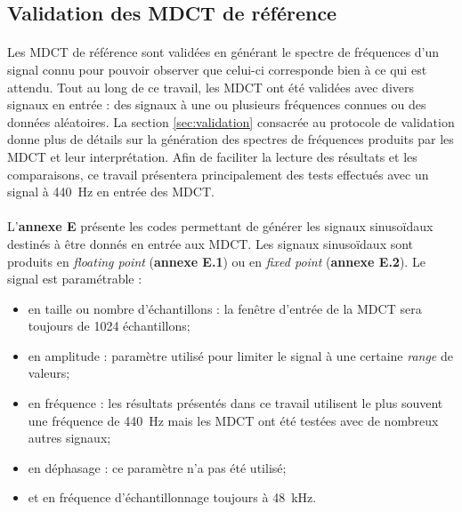 \documentclass{article}
\begin{document}
    \subsection{Validation des MDCT de référence}

    \paragraph{}
    Les MDCT de référence sont validées en générant le spectre de fréquences d'un signal connu pour pouvoir observer que celui-ci corresponde bien à ce qui est attendu. Tout au long de ce travail, les MDCT ont été validées avec divers signaux en entrée : des signaux à une ou plusieurs fréquences connues ou des données aléatoires. La section \ref{sec:validation} consacrée au protocole de validation donne plus de détails sur la génération des spectres de fréquences produits par les MDCT et leur interprétation. Afin de faciliter la lecture des résultats et les comparaisons, ce travail présentera principalement des tests effectués avec un signal à \SI{440}{\hertz} en entrée des MDCT.

    \paragraph{}
    L'\textbf{annexe E} présente les codes permettant de générer les signaux sinusoïdaux destinés à être donnés en entrée aux MDCT. Les signaux sinusoïdaux sont produits en \emph{floating point} (\textbf{annexe E.1}) ou en \emph{fixed point} (\textbf{annexe E.2}). Le signal est paramétrable :
    \begin{itemize}
        \item en taille ou nombre d'échantillons : la fenêtre d'entrée de la MDCT sera toujours de 1024 échantillons;
        \item en amplitude : paramètre utilisé pour limiter le signal à une certaine \emph{range} de valeurs;
        \item en fréquence : les résultats présentés dans ce travail utilisent le plus souvent une fréquence de \SI{440}{\hertz} mais les MDCT ont été testées avec de nombreux autres signaux;
        \item en déphasage : ce paramètre n'a pas été utilisé;
        \item et en fréquence d'échantillonnage toujours à \SI{48}{\kilo\hertz}.
    \end{itemize}
\end{document}
